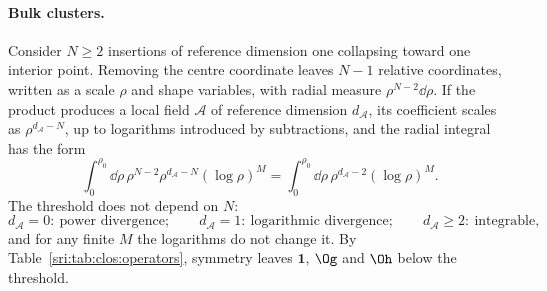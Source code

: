 \paragraph{Bulk clusters.} Consider $N\ge2$ insertions of reference dimension one collapsing toward one interior
point. Removing the centre coordinate leaves $N-1$ relative coordinates, written as a scale $\rho$ and shape
variables, with radial measure $\rho^{N-2}\dd\rho$. If the product produces a local field $\mathcal A$ of reference
dimension $d_{\mathcal A}$, its coefficient scales as $\rho^{d_{\mathcal A}-N}$, up to logarithms introduced by
subtractions, and the radial integral has the form
\begin{equation}
 \int_0^{\rho_0}\dd\rho\,\rho^{N-2}\rho^{d_{\mathcal A}-N}(\log\rho)^M
 =\int_0^{\rho_0}\dd\rho\,\rho^{d_{\mathcal A}-2}(\log\rho)^M .
 \label{sri:eq:clos:bulk}
\end{equation}
The threshold does not depend on $N$:
\begin{equation}
 d_{\mathcal A}=0:\ \text{power divergence};\qquad
 d_{\mathcal A}=1:\ \text{logarithmic divergence};\qquad
 d_{\mathcal A}\ge2:\ \text{integrable},
 \label{sri:eq:clos:threshold}
\end{equation}
and for any finite $M$ the logarithms do not change it. By Table~\ref{sri:tab:clos:operators}, symmetry leaves
$\mathbf 1$, $\Og$ and $\Oh$ below the threshold.


